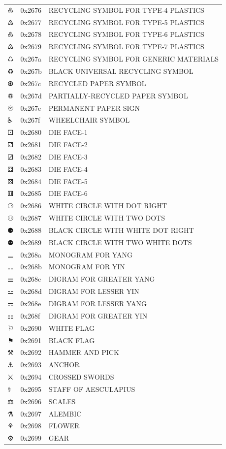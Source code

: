 \documentclass[12pt, twoside]{article}
\begin{document}
\begin{longtable}{L{1.0cm} L{2.0cm} >{\footnotesize}L{10cm}}
$♶$&0x2676&RECYCLING SYMBOL FOR TYPE-4 PLASTICS\\
$♷$&0x2677&RECYCLING SYMBOL FOR TYPE-5 PLASTICS\\
$♸$&0x2678&RECYCLING SYMBOL FOR TYPE-6 PLASTICS\\
$♹$&0x2679&RECYCLING SYMBOL FOR TYPE-7 PLASTICS\\
$♺$&0x267a&RECYCLING SYMBOL FOR GENERIC MATERIALS\\
$♻$&0x267b&BLACK UNIVERSAL RECYCLING SYMBOL\\
$♼$&0x267c&RECYCLED PAPER SYMBOL\\
$♽$&0x267d&PARTIALLY-RECYCLED PAPER SYMBOL\\
$♾$&0x267e&PERMANENT PAPER SIGN\\
$♿$&0x267f&WHEELCHAIR SYMBOL\\
$⚀$&0x2680&DIE FACE-1\\
$⚁$&0x2681&DIE FACE-2\\
$⚂$&0x2682&DIE FACE-3\\
$⚃$&0x2683&DIE FACE-4\\
$⚄$&0x2684&DIE FACE-5\\
$⚅$&0x2685&DIE FACE-6\\
$⚆$&0x2686&WHITE CIRCLE WITH DOT RIGHT\\
$⚇$&0x2687&WHITE CIRCLE WITH TWO DOTS\\
$⚈$&0x2688&BLACK CIRCLE WITH WHITE DOT RIGHT\\
$⚉$&0x2689&BLACK CIRCLE WITH TWO WHITE DOTS\\
$⚊$&0x268a&MONOGRAM FOR YANG\\
$⚋$&0x268b&MONOGRAM FOR YIN\\
$⚌$&0x268c&DIGRAM FOR GREATER YANG\\
$⚍$&0x268d&DIGRAM FOR LESSER YIN\\
$⚎$&0x268e&DIGRAM FOR LESSER YANG\\
$⚏$&0x268f&DIGRAM FOR GREATER YIN\\
$⚐$&0x2690&WHITE FLAG\\
$⚑$&0x2691&BLACK FLAG\\
$⚒$&0x2692&HAMMER AND PICK\\
$⚓$&0x2693&ANCHOR\\
$⚔$&0x2694&CROSSED SWORDS\\
$⚕$&0x2695&STAFF OF AESCULAPIUS\\
$⚖$&0x2696&SCALES\\
$⚗$&0x2697&ALEMBIC\\
$⚘$&0x2698&FLOWER\\
$⚙$&0x2699&GEAR\\

\end{longtable}
\end{document}
